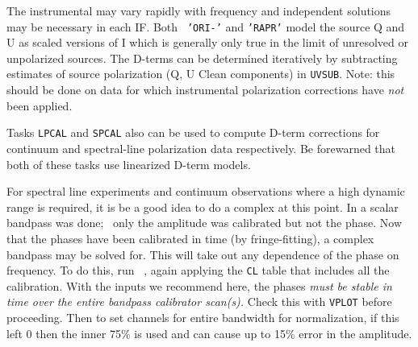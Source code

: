 The instrumental  may vary rapidly with frequency
and independent solutions may be necessary in each IF\@.  Both {\tt
'ORI-'} and {\tt 'RAPR'} model the source Q and U as scaled versions
of I which is generally only true in the limit of unresolved or
unpolarized sources.  The D-terms can be determined iteratively by
subtracting estimates of source polarization (Q, U Clean components)
in {\tt UVSUB}\@.  Note: this should be done on data for which
instrumental polarization corrections have {\it not\/} been applied.

Tasks {\tt LPCAL} and {\tt SPCAL} also can be used to compute D-term
corrections for continuum and spectral-line polarization data
respectively.  Be forewarned that both of these tasks use linearized
D-term models.


For spectral line experiments and continuum observations where a high
dynamic range is required, it is be a good idea to do a complex
 at this point.  In  a scalar
bandpass was done; \ie\ only the amplitude was calibrated but not the
phase.  Now that the phases have been calibrated in time (by
fringe-fitting), a complex bandpass may be solved for.  This will take
out any dependence of the phase on frequency.  To do this, run {\tt
{}}, again applying the {\tt CL} table that includes all the
calibration.  With the inputs we recommend here, the phases {\it
must be stable in time over the entire bandpass calibrator scan(s).}
Check this with {\tt VPLOT} before proceeding.  Then
         {to set channels for entire bandwidth for normalization, if
          this left 0 then the inner 75\% is used and can cause up to
          15\% error in the amplitude.}

